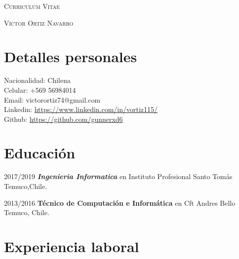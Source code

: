 \documentclass[a4,margin=1]{article}
\begin{document}
\pagestyle{empty}

\begin{center}
\huge{\textsc{Curriculum Vitae}}
\vspace{\baselineskip}

\Large{\textsc{Víctor Ortiz Navarro}}
\end{center}
\vspace{1.5\baselineskip}

\section{Detalles personales}

\begin{flushleft}
  Nacionalidad: Chilena \\
  Celular: +569 56984014 \\
  Email: victorortiz74@gmail.com \\
  Linkedin: \url{https://www.linkedin.com/in/vortiz115/} \\
  Github: \url{https://github.com/gunnerxd6} 
  
\end{flushleft}

\section{Educación}

\begin{CV}
\item[2017/2019] \emph{\textbf{Ingenieria Informatica}} en  Instituto Profesional Santo Tomás Temuco,Chile.
\item[2013/2016] \textbf{Técnico de Computación e Informática} en Cft Andres Bello Temuco, Chile.
\end{CV}


\section{Experiencia laboral}
\end{document}

